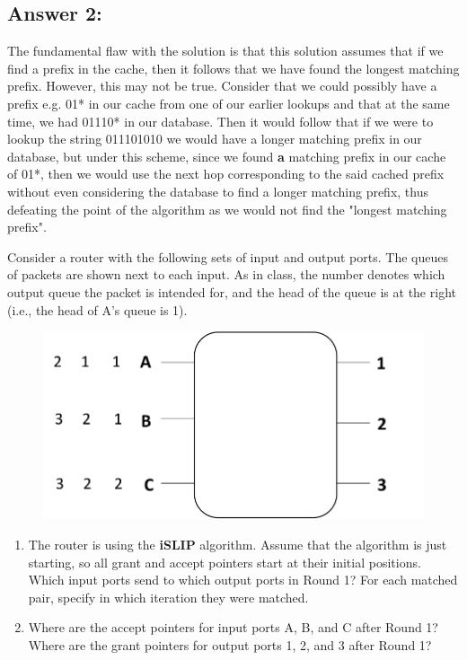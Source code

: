 \documentclass[10pt]{article}
\newenvironment{problem}[2][]{\begin{trivlist}
\item[\hskip \labelsep {\bfseries #1}\hskip \labelsep {\bfseries #2.}]}{\end{trivlist}}
\begin{document}
\subsection*{Answer 2:}
The fundamental flaw with the solution is that this solution assumes that if we find a prefix in the cache, then it follows that we have found the longest matching prefix. However, this may not be true. Consider that we could possibly have a prefix e.g. 01* in our cache from one of our earlier lookups and that at the same time, we had 01110* in our database. Then it would follow that if we were to lookup the string 011101010 we would have a longer matching prefix in our database, but under this scheme, since we found \textbf{a} matching prefix in our cache of 01*, then we would use the next hop corresponding to the said cached prefix without even considering the database to find a longer matching prefix, thus defeating the point of the algorithm as we would not find the "longest matching prefix".
\begin{problem}{3: Switching}
Consider a router with the following sets of input and output ports. The queues of packets are shown next to each input. As in class, the number denotes which output queue the packet is intended for, and the head of the queue is at the right (i.e., the head of A's queue is 1).

\begin{figure}[h]
    \centering
    \includegraphics[scale=0.6]{figures/islip.pdf}
    \label{fig:islip}
\end{figure}

\begin{enumerate}
    \item The router is using the \textbf{iSLIP} algorithm. Assume that the algorithm is just starting, so all grant and accept pointers start at their initial positions. Which input ports send to which output ports in Round 1? For each matched pair, specify in which iteration they were matched. 
    \item Where are the accept pointers for input ports A, B, and C after Round 1? Where are the grant pointers for output ports 1, 2, and 3 after Round 1?
\end{enumerate}
\end{problem}
\end{document}
